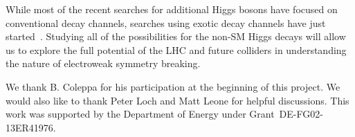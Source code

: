 While most of the recent searches for additional Higgs bosons have focused on conventional decay channels, searches using exotic decay channels have just started~\cite{Curtin:2013fra, Brownson:2013lka, Coleppa:2014hxa, Coleppa:2014cca,Li:2015lra,Dorsch:2014qja,Chen:2013emb,Chen:2014dma,Enberg:2014pua,CMS:2014yra,Aad:2015wra,CMS:2013eua}.   Studying all of the possibilities for the non-SM Higgs decays will allow us to explore the full potential of the LHC and future colliders in  understanding the nature of electroweak symmetry breaking. 

  
 
We thank B. Coleppa for his participation at the beginning of this project.  We would also like to thank Peter Loch and Matt Leone for helpful discussions. This work was supported by the Department of Energy under Grant~DE-FG02-13ER41976.
